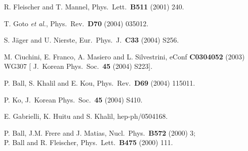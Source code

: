 \documentclass[12pt]{article}
\begin{document}
\begin{thebibliography}{999}
R. Fleischer and T. Mannel,
 { Phys.\ Lett.}~{\bf B511} (2001) 240.

T. Goto {\it et al.}, 
  { Phys.\ Rev.}~{\bf D70} (2004) 035012.
  
S. J\"ager and U. Nierste,
  { Eur.\ Phys.\ J.}~{\bf C33} (2004) S256.
  
 M. Ciuchini, E. Franco, A. Masiero and L. Silvestrini,
  { eConf} {\bf C0304052} (2003) WG307 
  [{ J.\ Korean Phys.\ Soc.}~{\bf 45} (2004) S223].

P. Ball, S. Khalil and E. Kou,
  { Phys.\ Rev.}~{\bf D69} (2004) 115011.

P. Ko,
  { J.\ Korean Phys.\ Soc.}~{\bf 45} (2004) S410.

E. Gabrielli, K. Huitu and S. Khalil,
  hep-ph/0504168.

P. Ball, J.M. Frere and J. Matias,
  { Nucl.\ Phys.}~{\bf B572} (2000) 3;\\
  P. Ball and R. Fleischer,
  { Phys.\ Lett.}~{\bf B475} (2000) 111.


\end{thebibliography}
\end{document}
